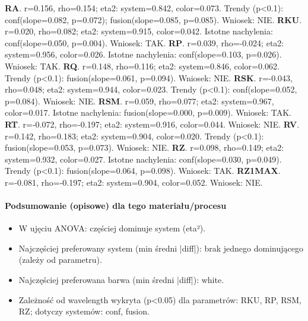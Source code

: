 \documentclass[
  10pt,
]{article}
\begin{document}
\textbf{RA}. r=0.156, rho=0.154; eta2: system=0.842, color=0.073. Trendy
(p\textless0.1): conf(slope=0.082, p=0.072); fusion(slope=0.085,
p=0.085). Wniosek: NIE. \textbf{RKU}. r=0.020, rho=0.082; eta2:
system=0.915, color=0.042. Istotne nachylenia: conf(slope=0.050,
p=0.004). Wniosek: TAK. \textbf{RP}. r=0.039, rho=-0.024; eta2:
system=0.956, color=0.026. Istotne nachylenia: conf(slope=0.103,
p=0.026). Wniosek: TAK. \textbf{RQ}. r=0.148, rho=0.116; eta2:
system=0.846, color=0.062. Trendy (p\textless0.1): fusion(slope=0.061,
p=0.094). Wniosek: NIE. \textbf{RSK}. r=-0.043, rho=0.048; eta2:
system=0.944, color=0.023. Trendy (p\textless0.1): conf(slope=0.052,
p=0.084). Wniosek: NIE. \textbf{RSM}. r=0.059, rho=0.077; eta2:
system=0.967, color=0.017. Istotne nachylenia: fusion(slope=0.000,
p=0.009). Wniosek: TAK. \textbf{RT}. r=-0.072, rho=-0.197; eta2:
system=0.916, color=0.044. Wniosek: NIE. \textbf{RV}. r=0.142,
rho=0.183; eta2: system=0.904, color=0.020. Trendy (p\textless0.1):
fusion(slope=0.053, p=0.073). Wniosek: NIE. \textbf{RZ}. r=0.098,
rho=0.149; eta2: system=0.932, color=0.027. Istotne nachylenia:
conf(slope=0.030, p=0.049). Trendy (p\textless0.1): fusion(slope=0.064,
p=0.098). Wniosek: TAK. \textbf{RZ1MAX}. r=-0.081, rho=-0.197; eta2:
system=0.904, color=0.052. Wniosek: NIE.

\paragraph{Podsumowanie (opisowe) dla tego materiału/procesu}
\begin{itemize}
\item W ujęciu ANOVA: częściej dominuje system (eta²).
\item Najczęściej preferowany system (min średni |diff|): brak jednego dominującego (zależy od parametru).
\item Najczęściej preferowana barwa (min średni |diff|): white.
\item Zależność od wavelength wykryta (p<0.05) dla parametrów: RKU, RP, RSM, RZ; dotyczy systemów: conf, fusion.
\end{itemize}
\end{document}

